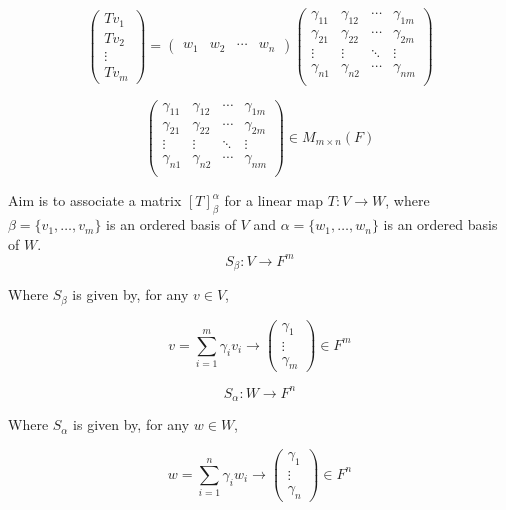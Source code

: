 \documentclass[11pt,a4paper]{colorart}
\def\l{\left}
\def\r{\right}
\def\a{\alpha}
\def\b{\beta}
\def\g{\gamma}
\begin{document}
\[ \begin{pmatrix} Tv_1 \\ Tv_2 \\ \vdots \\ Tv_m \end{pmatrix} = 
   \begin{pmatrix} w_1  & w_2  & \cdots & w_n  \end{pmatrix} 
   \begin{pmatrix}
	  \g_{11} & \g_{12} & \cdots & \g_{1m} \\
	  \g_{21} & \g_{22} & \cdots & \g_{2m} \\
	  \vdots  & \vdots  & \ddots & \vdots \\
	  \g_{n1} & \g_{n2} & \cdots & \g_{nm} \\
   \end{pmatrix} \]

\[ \begin{pmatrix}
	  \g_{11} & \g_{12} & \cdots & \g_{1m} \\
	  \g_{21} & \g_{22} & \cdots & \g_{2m} \\
	  \vdots  & \vdots  & \ddots & \vdots \\
	  \g_{n1} & \g_{n2} & \cdots & \g_{nm} \\
\end{pmatrix} \in M_{m\times n}\l(F\r)\]

Aim is to associate a matrix $\l[T\r]^{\a}_{\b}$ for a linear map $T:V\rightarrow W$, where $\b=\{v_1,\dots,v_m\}$ is an ordered basis of $V$ and $\a=\{w_1,\dots,w_n\}$ is an ordered basis of $W$.\\

\[ S_\b:V\rightarrow F^m \]

Where $S_\b$ is given by, for any $v\in V$,

\[ v = \sum_{i=1}^m \g_iv_i \rightarrow 
   \begin{pmatrix} \g_1\\ \vdots \\ \g_m \end{pmatrix} \in F^m \]

\[ S_\a:W\rightarrow F^n \]

Where $S_\a$ is given by, for any $w\in W$,

\[ w = \sum_{i=1}^n \g_iw_i \rightarrow 
   \begin{pmatrix} \g_1\\ \vdots \\ \g_n \end{pmatrix} \in F^n \]
\end{document}
